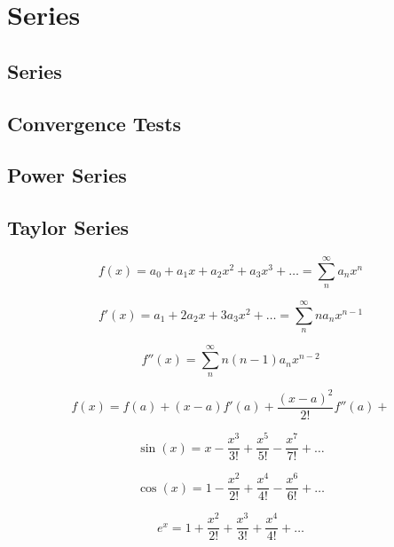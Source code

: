 \chapter{Series}

\section{Series}
\section{Convergence Tests}
\section{Power Series}

\section{Taylor Series}

\begin{equation*}
    f(x) = a_0 + a_1 x + a_2 x^2 + a_3 x^3 + \dots = \sum_{n}^{\infty}a_n x^n
\end{equation*}

\begin{equation*}
    f'(x) = a_1 + 2a_2 x + 3a_3 x^2 + \dots = \sum_{n}^{\infty}n a_n x^{n-1}
\end{equation*}

\begin{equation*}
    f''(x) = \sum_{n}^{\infty} n(n-1) a_n x^{n-2}
\end{equation*}

\begin{equation*}
    f(x) = f(a) + (x-a)f'(a) + \frac{(x-a)^2}{2!}f''(a) + 
\end{equation*}

\begin{equation*}
    \sin(x) = x - \frac{x^{3}}{3!} + \frac{x^{5}}{5!} - \frac{x^{7}}{7!} + \dots
\end{equation*}

\begin{equation*}
    \cos(x) = 1 - \frac{x^{2}}{2!} + \frac{x^{4}}{4!} - \frac{x^{6}}{6!} + \dots
\end{equation*}

\begin{equation*}
    e^{x} = 1 + \frac{x^{2}}{2!} + \frac{x^{3}}{3!} + \frac{x^{4}}{4!} + \dots
\end{equation*}

